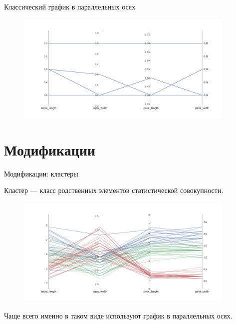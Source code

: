 \documentclass[fleqn, xcolor=x11names]{beamer}
\begin{document}
\begin{frame}{Классический график в параллельных осях}
    \begin{figure}[htb]
        \centering
        \includegraphics[width=10.5cm]{classic_pc.pdf}
    \end{figure}

\end{frame}

\section{Модификации}

\begin{frame}{Модификации: кластеры}

    \vspace{10px}

    Кластер — класс родственных элементов статистической совокупности.

    \begin{figure}[htb]
        \centering
        \includegraphics[width=10.5cm]{color_pc.pdf}
    \end{figure}

    Чаще всего именно в таком виде используют график в параллельных осях.
\end{frame}
\end{document}
